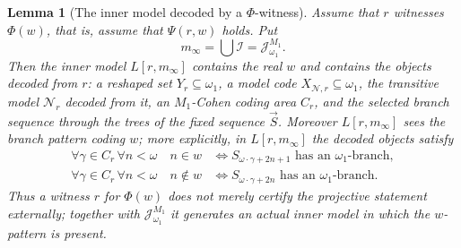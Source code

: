 \documentclass[a4paper,11pt]{article}
\newtheorem{lemma}[theorem]{Lemma}
\begin{document}
\begin{lemma}[The inner model decoded by a $\Phi$-witness]\label{lem:inner-model-decoded-by-Phi}
Assume that $r$ witnesses $\Phi(w)$, that is, assume that $\Psi(r,w)$ holds.  Put
\[
   m_\infty=\bigcup\mathcal I=\mathcal J^{M_1}_{\omega_1}.
\]
Then the inner model $L[r,m_\infty]$ contains the real $w$ and contains the objects decoded from $r$: a reshaped set $Y_r\subseteq\omega_1$, a model code $X_{\mathcal N,r}\subseteq\omega_1$, the transitive model $\mathcal N_r$ decoded from it, an $M_1$-Cohen coding area $C_r$, and the selected branch sequence through the trees of the fixed sequence $\vec S$.  Moreover $L[r,m_\infty]$ sees the branch pattern coding $w$; more explicitly, in $L[r,m_\infty]$ the decoded objects satisfy
\begin{align*}
   \forall \gamma\in C_r\,\forall n<\omega\quad
   n\in w
   &\Longleftrightarrow
   S_{\omega\cdot\gamma+2n+1}\text{ has an }\omega_1\text{-branch},\\
   \forall \gamma\in C_r\,\forall n<\omega\quad
   n\notin w
   &\Longleftrightarrow
   S_{\omega\cdot\gamma+2n}\text{ has an }\omega_1\text{-branch}.
\end{align*}
Thus a witness $r$ for $\Phi(w)$ does not merely certify the projective statement externally; together with $\mathcal J^{M_1}_{\omega_1}$ it generates an actual inner model in which the $w$-pattern is present.
\end{lemma}
\end{document}

